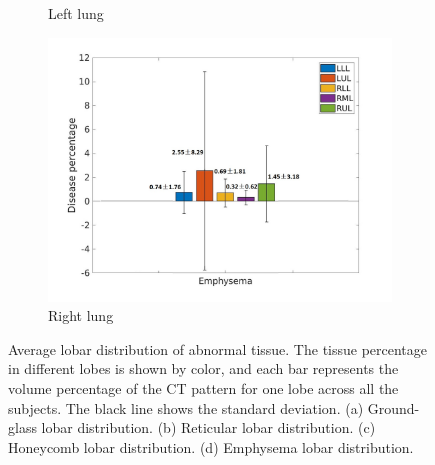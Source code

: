 \begin{figure}[H]
\begin{subfigure}{.46\linewidth}
  \caption{Left lung}
  \label{fig:LobarRegionDiseaseDistribution-c} 
\end{subfigure} 
\hspace{.3in}
\begin{subfigure}{.46\linewidth}%
  \includegraphics[width=\linewidth,trim={{.0\wd0} {.0\wd0} {.0\wd0} {.0\wd0}},clip]{QuantitativeAnalysis/Image/EmphysemaLobarRegionDiseaseDistribution.jpg}
  \caption{Right lung}
  \label{fig:LobarRegionDiseaseDistribution-d}
\end{subfigure}
\caption{Average lobar distribution of abnormal tissue. The tissue percentage in different lobes is shown by color, and each bar represents the volume percentage of the CT pattern for one lobe across all the subjects. The black line shows the standard deviation. (a) Ground-glass lobar distribution. (b) Reticular lobar distribution. (c) Honeycomb lobar distribution. (d) Emphysema lobar distribution.}
\label{fig:LobarRegionDiseaseDistribution}
\end{figure}

